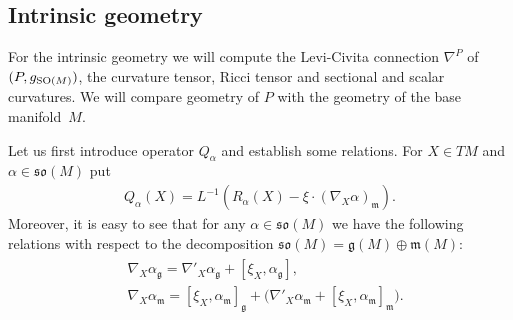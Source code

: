 \documentclass[pdftex]{sigma}
\numberwithin{equation}{section}
\begin{document}
\subsection{Intrinsic geometry}

For the intrinsic geometry we will compute the Levi-Civita connection $\nabla^P$ of $(P,g_{{\rm SO}(M)})$, the curvature tensor, Ricci tensor and sectional and scalar curvatures. We will compare geometry of $P$ with the geometry of the base manifold~$M$.

Let us f\/irst introduce operator $Q_{\alpha}$ and establish some relations. For $X\in TM$ and $\alpha\in\mathfrak{so}(M)$ put
\begin{gather*}
Q_{\alpha}(X)=L^{-1}(R_{\alpha}(X)-\xi\cdot(\nabla_X\alpha)_{\mathfrak{m}}).
\end{gather*}
Moreover, it is easy to see that for any $\alpha\in\mathfrak{so}(M)$ we have the following relations with respect to the decomposition $\mathfrak{so}(M)=\mathfrak{g}(M)\oplus\mathfrak{m}(M)$:
\begin{gather}\label{eq:basicrelations}
\begin{split}
&\nabla_X\alpha_{\mathfrak{g}} =\nabla'_X\alpha_{\mathfrak{g}}+[\xi_X,\alpha_{\mathfrak{g}}],\\
&\nabla_X\alpha_{\mathfrak{m}} =[\xi_X,\alpha_{\mathfrak{m}}]_{\mathfrak{g}}+\big( \nabla'_X\alpha_{\mathfrak{m}}+[\xi_X,\alpha_{\mathfrak{m}}]_{\mathfrak{m}} \big).
\end{split}
\end{gather}
\end{document}
